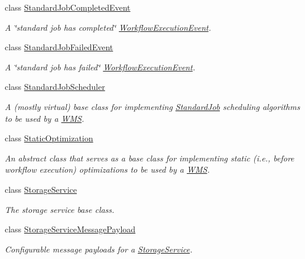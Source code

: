\begin{DoxyCompactItemize}
class \hyperlink{classwrench_1_1_standard_job_completed_event}{Standard\+Job\+Completed\+Event}
\begin{DoxyCompactList}\small\item\em A \char`\"{}standard job has completed\char`\"{} \hyperlink{classwrench_1_1_workflow_execution_event}{Workflow\+Execution\+Event}. \end{DoxyCompactList}\item 
class \hyperlink{classwrench_1_1_standard_job_failed_event}{Standard\+Job\+Failed\+Event}
\begin{DoxyCompactList}\small\item\em A \char`\"{}standard job has failed\char`\"{} \hyperlink{classwrench_1_1_workflow_execution_event}{Workflow\+Execution\+Event}. \end{DoxyCompactList}\item 
class \hyperlink{classwrench_1_1_standard_job_scheduler}{Standard\+Job\+Scheduler}
\begin{DoxyCompactList}\small\item\em A (mostly virtual) base class for implementing \hyperlink{classwrench_1_1_standard_job}{Standard\+Job} scheduling algorithms to be used by a \hyperlink{classwrench_1_1_w_m_s}{W\+MS}. \end{DoxyCompactList}\item 
class \hyperlink{classwrench_1_1_static_optimization}{Static\+Optimization}
\begin{DoxyCompactList}\small\item\em An abstract class that serves as a base class for implementing static (i.\+e., before workflow execution) optimizations to be used by a \hyperlink{classwrench_1_1_w_m_s}{W\+MS}. \end{DoxyCompactList}\item 
class \hyperlink{classwrench_1_1_storage_service}{Storage\+Service}
\begin{DoxyCompactList}\small\item\em The storage service base class. \end{DoxyCompactList}\item 
class \hyperlink{classwrench_1_1_storage_service_message_payload}{Storage\+Service\+Message\+Payload}
\begin{DoxyCompactList}\small\item\em Configurable message payloads for a \hyperlink{classwrench_1_1_storage_service}{Storage\+Service}. \end{DoxyCompactList}\item 

\end{DoxyCompactItemize}

